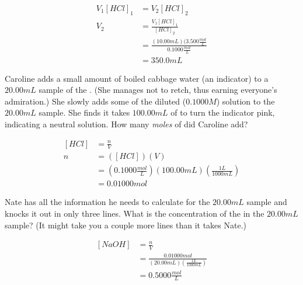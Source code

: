 \documentclass[11pt,addpoints]{exam}   	%
\begin{document}
\begin{questions}
\begin{solution}
\begin{equation} 
\begin{split}
   V_1 [HCl]_1 &= V_2 [HCl]_2 \\
   V_2 &= \frac{V_1 [HCl]_1} {[HCl]_2} \\
          &= \frac{(10.00 mL)(3.500 \frac{mol}{L} }{0.1000 \frac{mol}{L}} \\
          &= 350.0 mL
 \end{split}
 \end{equation}
\end{solution}

\vspace{0.2in}

\question[5] Caroline adds a small amount of boiled cabbage water (an indicator) to a $20.00 mL$ sample of the . 
(She manages not to retch, thus earning everyone's admiration.) 
She slowly adds some of the diluted ($0.1000 M$)  solution to the $20.00 mL$  sample. 
She finds it takes $100.00 mL$ of  to turn the indicator pink, indicating a neutral solution.
How many \emph{moles} of  did Caroline add?

\begin{solution}
\begin{equation} 
\begin{split}
   [HCl] &= \frac{n}{V} \\
        n  &= ([HCl])(V) \\
            &= (0.1000 \frac{mol}{L}) (100.00 mL) (\frac{1 L}{1000 mL}) \\
            &= 0.01000 mol 
 \end{split}
 \end{equation}
\end{solution}

\vspace{0.2in}

\question[5] Nate has all the information he needs to calculate \ce{[NaOH]} for the $20.00 mL$ sample and knocks it out in only three lines. 
What is the concentration of the  in the $20.00 mL$ sample?
(It might take you a couple more lines than it takes Nate.)

\begin{solution}
\begin{equation} 
\begin{split}
   [NaOH] &= \frac{n}{V} \\
                &= \frac{0.01000 mol}{(20.00 mL)(\frac{1 L}{1000 mL})} \\
                &= 0.5000 \frac{mol}{L}
 \end{split}
 \end{equation}
\end{solution}


\end{questions}
\end{document}
